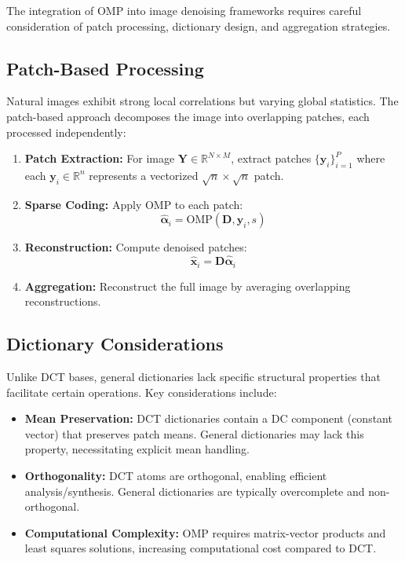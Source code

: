 \documentclass[12pt]{article}
\renewcommand{\vec}[1]{\mathbf{#1}}
\theoremstyle{definition}
\begin{document}
The integration of OMP into image denoising frameworks requires careful consideration of patch processing, dictionary design, and aggregation strategies.

\subsection{Patch-Based Processing}
\label{subsec:patch_processing}

Natural images exhibit strong local correlations but varying global statistics. The patch-based approach decomposes the image into overlapping patches, each processed independently:

\begin{enumerate}[label=\textbf{\arabic*.}]
    \item \textbf{Patch Extraction:} For image $\mathbf{Y} \in \mathbb{R}^{N \times M}$, extract patches $\{\vec{y}_i\}_{i=1}^P$ where each $\vec{y}_i \in \mathbb{R}^n$ represents a vectorized $\sqrt{n} \times \sqrt{n}$ patch.

    \item \textbf{Sparse Coding:} Apply OMP to each patch:
          \begin{equation}
              \hat{\vec{\alpha}}_i = \text{OMP}(\mathbf{D}, \vec{y}_i, s)
          \end{equation}

    \item \textbf{Reconstruction:} Compute denoised patches:
          \begin{equation}
              \hat{\vec{x}}_i = \mathbf{D} \hat{\vec{\alpha}}_i
          \end{equation}

    \item \textbf{Aggregation:} Reconstruct the full image by averaging overlapping reconstructions.
\end{enumerate}

\subsection{Dictionary Considerations}
\label{subsec:dictionary_considerations}

Unlike DCT bases, general dictionaries lack specific structural properties that facilitate certain operations. Key considerations include:

\begin{itemize}[leftmargin=*]
    \item \textbf{Mean Preservation:} DCT dictionaries contain a DC component (constant vector) that preserves patch means. General dictionaries may lack this property, necessitating explicit mean handling.

    \item \textbf{Orthogonality:} DCT atoms are orthogonal, enabling efficient analysis/synthesis. General dictionaries are typically overcomplete and non-orthogonal.

    \item \textbf{Computational Complexity:} OMP requires matrix-vector products and least squares solutions, increasing computational cost compared to DCT.
\end{itemize}
\end{document}
